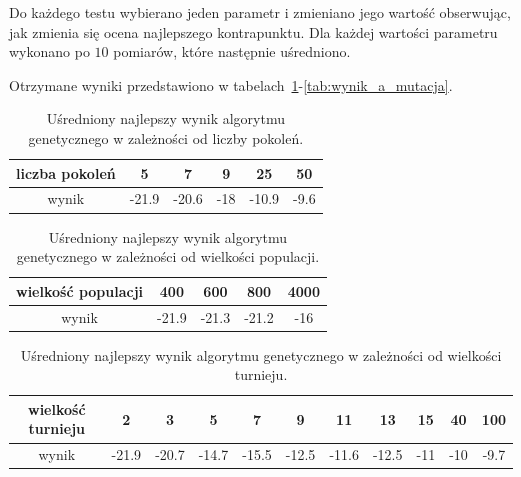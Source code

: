 \documentclass{article}
\begin{document}
Do każdego testu wybierano jeden parametr i zmieniano jego wartość obserwując, jak zmienia się ocena najlepszego kontrapunktu. Dla każdej wartości parametru wykonano po $10$ pomiarów, które następnie uśredniono.

Otrzymane wyniki przedstawiono w tabelach~\ref{tab:wynik_a_liczba_generacji}-\ref{tab:wynik_a_mutacja}.

\begin{table}
\begin{center}
  \begin{tabular}{ | c || c | c | c | c | c | }
    \hline
	liczba pokoleń & 5 & 7 & 9 & 25 & 50 \\ \hline
	wynik & -21.9 & -20.6 & -18 & -10.9 & -9.6 \\ \hline
  \end{tabular}
  \caption{Uśredniony najlepszy wynik algorytmu genetycznego w zależności od liczby pokoleń.}
  \label{tab:wynik_a_liczba_generacji}
  \end{center}
\end{table}

\begin{table}
\begin{center}
  \begin{tabular}{ | c || c | c | c | c | }
    \hline
	wielkość populacji & 400 & 600 & 800 & 4000 \\ \hline
	wynik & -21.9 & -21.3 & -21.2 & -16 \\ \hline
  \end{tabular}
  \caption{Uśredniony najlepszy wynik algorytmu genetycznego w zależności od wielkości populacji.}
  \label{tab:wynik_a_wielkosc_populacji}
  \end{center}
\end{table}

\begin{table}
\begin{center}
  \begin{tabular}{ | c || c | c | c | c | c | c | c | c | c | c |}
    \hline
	wielkość turnieju & 2 & 3 & 5 & 7 & 9 & 11 & 13 & 15 & 40 & 100 \\ \hline
	wynik & -21.9 & -20.7 & -14.7 & -15.5 & -12.5 & -11.6 & -12.5 & -11 & -10 & -9.7 \\ \hline
  \end{tabular}
  \caption{Uśredniony najlepszy wynik algorytmu genetycznego w zależności od wielkości turnieju.} 
  \label{tab:wynik_a_tournament_size}
  \end{center}
\end{table}
\end{document}
